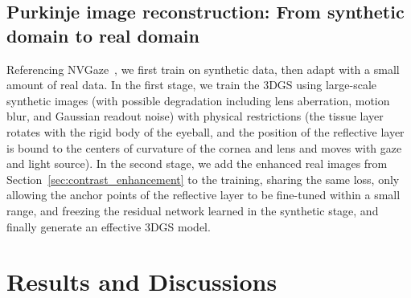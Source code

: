 \documentclass[sigconf, screen, review]{acmart}
\begin{document}
\subsection{Purkinje image reconstruction: From synthetic domain to real domain}

Referencing NVGaze~\cite{NVGaze}, we first train on synthetic data, then adapt with a small amount of real data. In the first stage, we train the 3DGS using large-scale synthetic images (with possible degradation including lens aberration, motion blur, and Gaussian readout noise) with physical restrictions (the tissue layer rotates with the rigid body of the eyeball, and the position of the reflective layer is bound to the centers of curvature of the cornea and lens and moves with gaze and light source). In the second stage, we add the enhanced real images from Section~\ref{sec:contrast_enhancement} to the training, sharing the same loss, only allowing the anchor points of the reflective layer to be fine-tuned within a small range, and freezing the residual network learned in the synthetic stage, and finally generate an effective 3DGS model.
\section{Results and Discussions}



\end{document}
